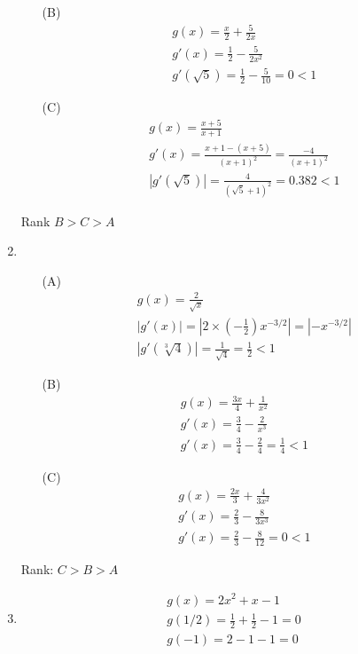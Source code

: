 \documentclass[UTF8]{ctexart}
\begin{document}
\begin{enumerate}
\begin{itemize}
\item[(B)]
\begin{gather*}
g(x) = \frac{x}{2} + \frac{5}{2x} \\
g'(x) = \frac{1}{2} - \frac{5}{2x^2} \\
g'(\sqrt{5}) = \frac{1}{2} - \frac{5}{10} = 0 < 1
\end{gather*}

\item[(C)]
\begin{gather*}
g(x) = \frac{x+5}{x+1} \\
g'(x) = \frac{x+1 - (x+5)}{(x+1)^2} = \frac{-4}{(x+1)^2} \\
|g'(\sqrt{5})| = \frac{4}{(\sqrt{5} + 1)^2} = 0.382 < 1
\end{gather*}

\end{itemize}
Rank $B > C > A$

\item \begin{itemize}
\item[(A)] 
\begin{gather*}
g(x) = \frac{2}{\sqrt{x}} \\
|g'(x)| = |2 \times (-\frac{1}{2}) x^{-3/2}| = |-x^{-3/2}| \\
|g'(\sqrt[3]{4})| = \frac{1}{\sqrt{4}} = \frac{1}{2} < 1
\end{gather*}

\item[(B)]
\begin{gather*}
g(x) = \frac{3x}{4} + \frac{1}{x^2} \\
g'(x) = \frac{3}{4} - \frac{2}{x^3} \\
g'(x) = \frac{3}{4} - \frac{2}{4} = \frac{1}{4} < 1
\end{gather*}

\item[(C)]
\begin{gather*}
g(x) = \frac{2x}{3} + \frac{4}{3x^2} \\
g'(x) = \frac{2}{3} - \frac{8}{3x^3} \\
g'(x) = \frac{2}{3} - \frac{8}{12} = 0 < 1
\end{gather*}

\end{itemize}

Rank: $C > B > A$

\item 
\begin{gather*}
	g(x) = 2x^2 + x - 1 \\
	g(1/2) = \frac{1}{2} + \frac{1}{2} - 1 = 0 \\
	g(-1) = 2 - 1 - 1 = 0
\end{gather*}


\end{enumerate}
\end{document}
